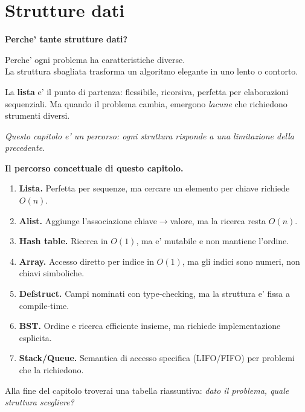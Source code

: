 
\chapter{Strutture dati}

\begin{intuizione}
{\large\bfseries Perche' tante strutture dati?}

\medskip
Perche' ogni problema ha caratteristiche diverse.\\[2pt]
\textcolor{black!60}{La struttura sbagliata trasforma un algoritmo elegante in uno lento o contorto.}

\medskip
La \textbf{lista} e' il punto di partenza: flessibile, ricorsiva, perfetta
per elaborazioni sequenziali. Ma quando il problema cambia, emergono
\emph{lacune} che richiedono strumenti diversi.

\medskip
\textcolor{csTeal}{\itshape Questo capitolo e' un percorso: ogni struttura risponde
a una limitazione della precedente.}
\end{intuizione}

\begin{tcolorbox}[
  enhanced,
  colback=black!2, colframe=black!20,
  arc=3pt, boxrule=0.4pt,
  left=12pt, right=12pt, top=9pt, bottom=9pt,
  before skip=8pt, after skip=10pt
]
\small\color{black!65}

\textbf{Il percorso concettuale di questo capitolo.}

\medskip
\begin{enumerate}
  \item \textbf{Lista.} Perfetta per sequenze, ma cercare un elemento
        per chiave richiede $O(n)$.
  \item \textbf{Alist.} Aggiunge l'associazione chiave$\to$valore,
        ma la ricerca resta $O(n)$.
  \item \textbf{Hash table.} Ricerca in $O(1)$, ma e' mutabile
        e non mantiene l'ordine.
  \item \textbf{Array.} Accesso diretto per indice in $O(1)$,
        ma gli indici sono numeri, non chiavi simboliche.
  \item \textbf{Defstruct.} Campi nominati con type-checking,
        ma la struttura e' fissa a compile-time.
  \item \textbf{BST.} Ordine e ricerca efficiente insieme,
        ma richiede implementazione esplicita.
  \item \textbf{Stack/Queue.} Semantica di accesso specifica
        (LIFO/FIFO) per problemi che la richiedono.
\end{enumerate}

\medskip
Alla fine del capitolo troverai una tabella riassuntiva:
\emph{dato il problema, quale struttura scegliere?}
\end{tcolorbox}

